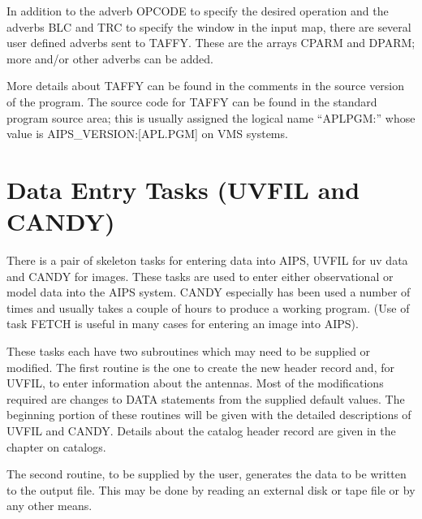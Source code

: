 In addition to the adverb OPCODE to specify the desired operation and
the adverbs BLC and TRC to specify the window in the input map, there
are several user defined adverbs sent to TAFFY.  These are the arrays
CPARM and DPARM; more and/or other adverbs can be added.

More details about TAFFY can be found in the comments in the source
version of the program.  The source code for TAFFY can be found in the
standard program source area; this is usually assigned the logical
name ``APLPGM:'' whose value is AIPS\_VERSION:[APL.PGM] on VMS systems.


\section{Data Entry Tasks (UVFIL and CANDY)}
 There is a pair of skeleton tasks for entering data into AIPS, UVFIL
for uv data and CANDY for images.  These tasks are used to enter
either observational or model data into the AIPS system.  CANDY
especially has been used a number of times and usually takes a couple
of hours to produce a working program.  (Use of task FETCH is useful
in many cases for entering an image into AIPS).

These tasks each have two subroutines which may need to be supplied or
modified.  The first routine is the one to create the new header
record and, for UVFIL, to enter information about the antennas. Most
of the modifications required are changes to DATA statements from the
supplied default values.  The beginning portion of these routines will
be given with the detailed descriptions of UVFIL and CANDY. Details
about the catalog header record are given in the chapter on catalogs.

 The second routine, to be supplied by the user, generates the data to
be written to the output file.  This may be done by reading an
external disk or tape file or by any other means.

